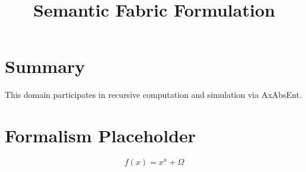 \documentclass[12pt]{article}
\title{\textbf{Semantic Fabric Formulation}}
\begin{document}
\maketitle

\section*{Summary}
This domain participates in recursive computation and simulation via AxAbsEnt.

\section*{Formalism Placeholder}
\[
f(x) = x^n + \Omega
\]
\end{document}

